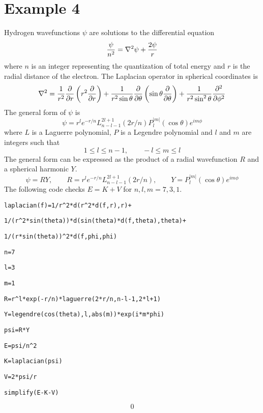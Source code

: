 
\newpage

\section*{Example 4}

Hydrogen wavefunctions $\psi$ are solutions to the differential equation
$${\psi\over n^2}=\nabla^2\psi+{2\psi\over r}$$
where $n$ is an integer representing the quantization of total energy and
$r$ is the radial distance of the electron.
The Laplacian operator in spherical coordinates is
$$\nabla^2={1\over r^2}{\partial\over\partial r}
\left(r^2{\partial\over\partial r}\right)
+{1\over r^2\sin\theta}{\partial\over\partial\theta}
\left(\sin\theta{\partial\over\partial\theta}\right)
+{1\over r^2\sin^2\theta}{\partial^2\over\partial\phi^2}$$
The general form of $\psi$ is
$$\psi=r^le^{-r/n}L_{n-l-1}^{2l+1}(2r/n)
P_l^{|m|}(\cos\theta)e^{im\phi}$$
where $L$ is a Laguerre polynomial, $P$ is a Legendre polynomial and
$l$ and $m$ are integers such that
$$1\le l\le n-1,\qquad -l\le m\le l$$
The general form can be expressed as the product of a radial
wavefunction $R$ and a spherical harmonic $Y$.
$$\psi=RY,\qquad R=r^le^{-r/n}L_{n-l-1}^{2l+1}(2r/n),\qquad
Y=P_l^{|m|}(\cos\theta)e^{im\phi}$$
The following code checks $E=K+V$ for $n,l,m=7,3,1$.

\medskip
\verb$laplacian(f)=1/r^2*d(r^2*d(f,r),r)+$

\verb$1/(r^2*sin(theta))*d(sin(theta)*d(f,theta),theta)+$

\verb$1/(r*sin(theta))^2*d(f,phi,phi)$

\verb$n=7$

\verb$l=3$

\verb$m=1$

\verb$R=r^l*exp(-r/n)*laguerre(2*r/n,n-l-1,2*l+1)$

\verb$Y=legendre(cos(theta),l,abs(m))*exp(i*m*phi)$

\verb$psi=R*Y$

\verb$E=psi/n^2$

\verb$K=laplacian(psi)$

\verb$V=2*psi/r$

\verb$simplify(E-K-V)$

$$0$$

